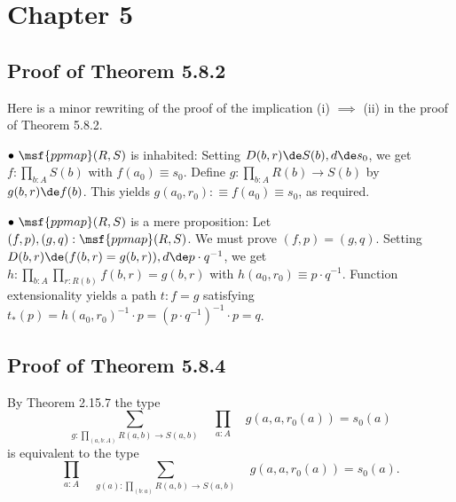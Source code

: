\documentclass[12pt]{article}
\begin{document}

\section{Chapter 5}

\subsection{Proof of Theorem 5.8.2}\label{582}

Here is a minor rewriting of the proof of the implication (i) $\implies$ (ii) in the proof of Theorem 5.8.2. 

\nn$\bullet\ \msf{ppmap}(R,S)$ is inhabited: Setting $D(b,r)\de S(b),d\de s_0$, we get $f:\prod_{b:A}S(b)$ with $f(a_0)\equiv s_0$. Define $g:\prod_{b:A}R(b)\to S(b)$ by $g(b,r)\de f(b)$. This yields $g(a_0,r_0):\equiv f(a_0)\equiv s_0$, as required. 

\nn$\bullet\ \msf{ppmap}(R,S)$ is a mere proposition: Let $(f,p),(g,q):\msf{ppmap}(R,S)$. We must prove $(f,p)=(g,q)$. Setting $D(b,r)\de(f(b,r)=g(b,r)),d\de p\cdot q^{-1}$, we get $h:\prod_{b:A}\prod_{r:R(b)}f(b,r)=g(b,r)$ with $h(a_0,r_0)\equiv p\cdot q^{-1}$. Function extensionality yields a path $t:f=g$ satisfying $t_*(p)=h(a_0,r_0)^{-1}\cdot p=(p\cdot q^{-1})^{-1}\cdot p=q$.%


\subsection{Proof of Theorem 5.8.4}

By Theorem 2.15.7 the type 
$$
\sum_{g:\prod_{(a,b:A)}R(a,b)\to S(a,b)}\quad\prod_{a:A}\quad g(a,a,r_0(a))=s_0(a)
$$ 
is equivalent to the type
$$
\prod_{a:A}\quad\sum_{g(a):\prod_{(b:a)}R(a,b)\to S(a,b)}\quad g(a,a,r_0(a))=s_0(a).
$$




\end{document}
